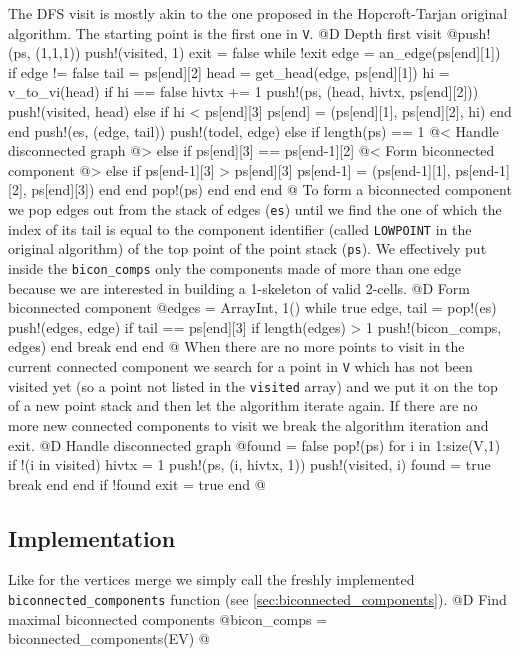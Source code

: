 \documentclass[10pt,oneside]{article}
\begin{document}
The DFS visit is mostly akin to the one proposed in the Hopcroft-Tarjan original algorithm.
The starting point is the first one in \texttt{V}.
@D Depth first visit
@{push!(ps, (1,1,1))
push!(visited, 1)
exit = false
while !exit
    edge = an_edge(ps[end][1])
    if edge != false
        tail = ps[end][2]
        head = get_head(edge, ps[end][1])
        hi = v_to_vi(head)
        if hi == false
            hivtx += 1
            push!(ps, (head, hivtx, ps[end][2]))
            push!(visited, head)
        else
            if hi < ps[end][3]
                ps[end] = (ps[end][1], ps[end][2], hi)
            end
        end
        push!(es, (edge, tail))
        push!(todel, edge)
    else
        if length(ps) == 1
            @< Handle disconnected graph @>
        else
            if ps[end][3] == ps[end-1][2]
                @< Form biconnected component @>
            else
                if ps[end-1][3] > ps[end][3]
                    ps[end-1] = (ps[end-1][1], ps[end-1][2], ps[end][3])
                end
            end
            pop!(ps)
        end
    end
end
@}
To form a biconnected component we pop edges out from the stack of edges (\texttt{es}) until we find the one
of which the index of its tail is equal to the component identifier (called \texttt{LOWPOINT} in the original algorithm) 
of the top point of the point stack (\texttt{ps}). We effectively put inside the \texttt{bicon\_comps} only the components
made of more than one edge because we are interested in building a 1-skeleton of valid 2-cells.
@D Form biconnected component
@{edges = Array{Int, 1}()
while true
    edge, tail = pop!(es)
    push!(edges, edge)
    if tail == ps[end][3]
        if length(edges) > 1
            push!(bicon_comps, edges)
        end
        break
    end
end
@}
When there are no more points to visit in the current connected component we search for a point in \texttt{V}
which has not been visited yet (so a point not listed in the \texttt{visited} array) and we put it on the top
of a new point stack and then let the algorithm iterate again. If there are no more new connected components 
to visit we break the algorithm iteration and exit.
@D Handle disconnected graph
@{found = false
pop!(ps)
for i in 1:size(V,1)
    if !(i in visited)
        hivtx = 1
        push!(ps, (i, hivtx, 1))
        push!(visited, i)
        found = true
        break
    end
end
if !found
    exit = true
end
@}
\subsection{Implementation}
Like for the vertices merge we simply call the freshly implemented \texttt{biconnected\_components} function
(see \ref{sec:biconnected_components}).
@D Find maximal biconnected components
@{bicon_comps = biconnected_components(EV)
@}
\end{document}
